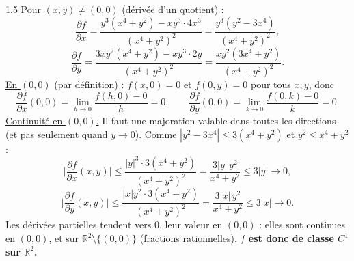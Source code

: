 \documentclass[12pt]{article}
\begin{document}
\begin{spacing}{1.5}
\underline{Pour $(x,y)\neq(0,0)$} (dérivée d'un quotient) :
\[
\frac{\partial f}{\partial x}=\frac{y^3(x^4+y^2)-xy^3\cdot4x^3}{(x^4+y^2)^2}=\frac{y^3(y^2-3x^4)}{(x^4+y^2)^2},
\]
\[
\frac{\partial f}{\partial y}=\frac{3xy^2(x^4+y^2)-xy^3\cdot2y}{(x^4+y^2)^2}=\frac{xy^2(3x^4+y^2)}{(x^4+y^2)^2}.
\]
\underline{En $(0,0)$} (par définition) : $f(x,0)=0$ et $f(0,y)=0$ pour tous $x,y$, donc
\[
\frac{\partial f}{\partial x}(0,0)=\lim_{h\to0}\frac{f(h,0)-0}{h}=0,\qquad\frac{\partial f}{\partial y}(0,0)=\lim_{k\to0}\frac{f(0,k)-0}{k}=0 .
\]
\underline{Continuité en $(0,0)$.} Il faut une majoration valable dans toutes les directions (et pas seulement quand $y\to0$). Comme $|y^2-3x^4|\le3(x^4+y^2)$ et $y^2\le x^4+y^2$ :
\[
\Big|\frac{\partial f}{\partial x}(x,y)\Big|\le\frac{|y|^3\cdot3(x^4+y^2)}{(x^4+y^2)^2}=\frac{3|y|\,y^2}{x^4+y^2}\le3|y|\to0,
\]
\[
\Big|\frac{\partial f}{\partial y}(x,y)\Big|\le\frac{|x|y^2\cdot3(x^4+y^2)}{(x^4+y^2)^2}=\frac{3|x|\,y^2}{x^4+y^2}\le3|x|\to0 .
\]
Les dérivées partielles tendent vers $0$, leur valeur en $(0,0)$ : elles sont continues en $(0,0)$, et sur $\mathbb{R}^2\setminus\{(0,0)\}$ (fractions rationnelles). \textbf{$f$ est donc de classe $C^1$ sur $\mathbb{R}^2$.}

\end{spacing}
\end{document}
